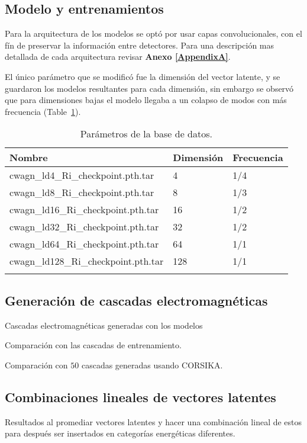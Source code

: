 \subsection*{Modelo y entrenamientos}

Para la arquitectura de los modelos se optó por usar capas convolucionales, con el fín de preservar la información entre detectores. Para una descripción mas detallada de cada arquitectura revisar \textbf{Anexo \ref{AppendixA}}.

El único parámetro que se modificó fue la dimensión del vector latente, y se guardaron los modelos resultantes para cada dimensión, sin embargo se observó que para dimensiones bajas el modelo llegaba a un colapso de modos con más frecuencia (Table~\ref{tab:latentDimTrains}).

\begin{table}
    \caption{Parámetros de la base de datos.}
    \label{tab:latentDimTrains}
    \centering
    \begin{tabular}{l l l}
        \toprule
        \textbf{Nombre} & \textbf{Dimensión} & \textbf{Frecuencia} \\
        \midrule
        cwagn\_ld4\_Ri\_checkpoint.pth.tar     & 4    & 1/4\\
        cwagn\_ld8\_Ri\_checkpoint.pth.tar     & 8    & 1/3\\
        cwagn\_ld16\_Ri\_checkpoint.pth.tar    & 16   & 1/2\\
        cwagn\_ld32\_Ri\_checkpoint.pth.tar    & 32   & 1/2\\
        cwagn\_ld64\_Ri\_checkpoint.pth.tar    & 64   & 1/1\\
        cwagn\_ld128\_Ri\_checkpoint.pth.tar   & 128  & 1/1\\
        \bottomrule\\
    \end{tabular}
\end{table}

\subsection*{Generación de cascadas electromagnéticas}

Cascadas electromagnéticas generadas con los modelos 

Comparación con las cascadas de entrenamiento.

Comparación con $50$ cascadas generadas usando CORSIKA.

\subsection*{Combinaciones lineales de vectores latentes}

Resultados al promediar vectores latentes y hacer una combinación lineal de estos para después ser insertados en categorías energéticas diferentes.

